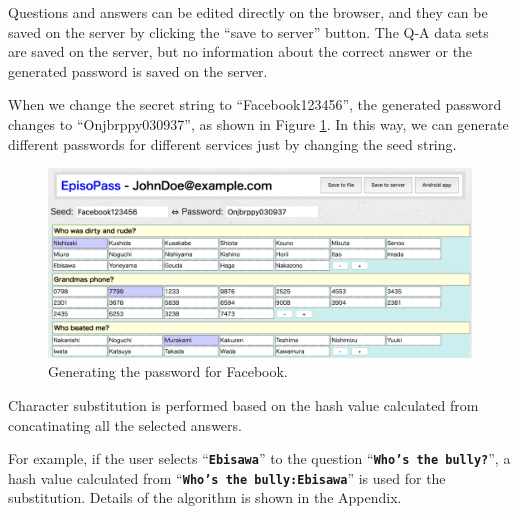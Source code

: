 \documentclass[runningheads,a4paper]{llncs}
\begin{document}
Questions and answers can be edited directly on the browser, and they can be
saved on the server by clicking the ``save to server'' button.
The Q-A data sets are saved on the server,
but no information about the correct answer or the
generated password is saved on the server.


When we change the secret string to ``\textsf{Facebook123456}'',
the generated password changes to ``\textsf{Onjbrppy030937}'',
as shown in Figure \ref{web2}.
In this way, we can generate different passwords for
different services just by changing the seed string.

\begin{figure}[H]
  \centering
  \includegraphics[width=1.0\columnwidth]{figures/ab4517dd593c1cabab5fecef546f7e88}
  \caption{Generating the password for Facebook.}
  \label{web2}
\end{figure}



Character substitution is performed based on the hash value
calculated from concatinating all the selected answers.
  
For example, if the user selects ``\textbf{\texttt{Ebisawa}}'' to the question ``\textbf{\texttt{Who's the bully?}}'',
a hash value calculated from  ``\textbf{\texttt{Who's the bully:Ebisawa}}''
is used for the substitution.
Details of the algorithm is shown in the Appendix.
\end{document}
